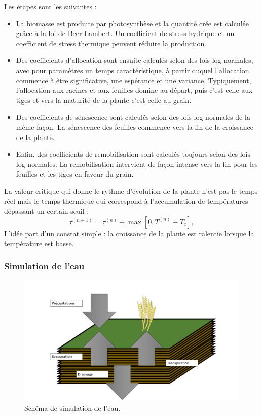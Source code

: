 Les étapes sont les suivantes : 

\begin{itemize}

\item La biomasse est produite par photosynthèse et la quantité crée est calculée grâce à la loi de Beer-Lambert.  Un coefficient de stress hydrique et un coefficient de stress thermique peuvent réduire la production.

\item Des coefficients d'allocation sont ensuite calculés selon des lois log-normales, avec pour paramètres un temps caractéristique, à partir duquel l'allocation commence à être significative, une espérance et une variance. Typiquement, l'allocation aux racines et aux feuilles domine au départ, puis c'est celle aux tiges et vers la maturité de la plante c'est celle au grain.

\item Des coefficients de sénescence sont calculés selon des lois log-normales de la même façon. La sénescence des feuilles commence vers la fin de la croissance de la plante.

\item Enfin, des coefficients de remobilisation sont calculés toujours selon des lois log-normales. La remobilisation intervient de façon intense vers la fin pour les feuilles et les tiges en faveur du grain.

\end{itemize}

La valeur critique qui donne le rythme d'évolution de la plante n'est pas le temps réel mais le temps thermique qui correspond à l'accumulation de températures dépassant un certain seuil :
\[
\tau^{(n+1)} = \tau^{(n)} + \max[0, \underline{T^{(n)}} - T_c], 
\]
L'idée part d'un constat simple : la croissance de la plante est ralentie lorsque la température est basse.

\subsubsection{Simulation de l'eau}

\begin{figure}[H]

\begin{center}
 \includegraphics[scale = 0.42]{./img/waterSchema.png}
 \caption{Schéma de simulation de l'eau.}
 \label{fig:waterModel}
\end{center}

\end{figure}


